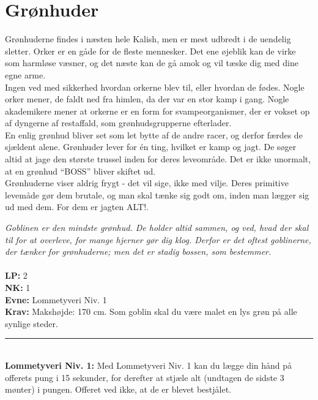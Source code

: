 \section{Grønhuder}
Grønhuderne findes i næsten hele Kalish, men er mest udbredt i de uendelig sletter. Orker er en gåde for de fleste mennesker. Det ene øjeblik kan de virke som harmløse væsner, og det næste kan de gå amok og vil tæske dig med dine egne arme.\\
Ingen ved med sikkerhed hvordan orkerne blev til, eller hvordan de fødes. Nogle orker mener, de faldt ned fra himlen, da der var en stor kamp i gang. Nogle akademikere mener at orkerne er en form for svampeorganismer, der er vokset op af dyngerne af restaffald, som grønhudsgrupperne efterlader.\\
En enlig grønhud bliver set som let bytte af de andre racer, og derfor færdes de sjældent alene. Grønhuder lever for én ting, hvilket er kamp og jagt. De søger altid at jage den største trussel inden for deres leveområde. Det er ikke unormalt, at en grønhud “BOSS” bliver skiftet ud.\\
Grønhuderne viser aldrig frygt - det vil sige, ikke med vilje. Deres primitive levemåde gør dem brutale, og man skal tænke sig godt om, inden man lægger sig ud med dem. For dem er jagten ALT!.
\begin{race*}[Gobliner]
\textit{Goblinen er den mindste grønhud. De holder altid sammen, og ved, hvad der skal til for at overleve, for mange hjerner gør dig klog. Derfor er det oftest goblinerne, der tænker for grønhuderne; men det er stadig bossen, som bestemmer.}\\
\\
\textbf{LP:} 2\\ 
\textbf{NK:} 1\\ 
\textbf{Evne:} Lommetyveri Niv. 1\\
\textbf{Krav:} Makshøjde: 170 cm. Som goblin skal du være malet en lys grøn på alle synlige steder.\\
\rule{\textwidth}{0.4pt}\\
\textbf{Lommetyveri Niv. 1:} Med Lommetyveri Niv. 1 kan du lægge din hånd på offerets pung i 15 sekunder, for derefter at stjæle alt (undtagen de sidste 3 mønter) i pungen. Offeret ved ikke, at de er blevet bestjålet.\\
\end{race*}

